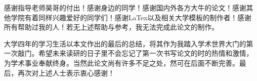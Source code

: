 \begin{acknowledgement}
    感谢指导老师昊哥的付出！感谢身边的同学！感谢国内外各方大牛的论文！感谢其他学院有着同样兴趣爱好的同学们！感谢LaTex以及相关大学模板的制作者！感谢所有帮助过我的人！若无上述帮助与参考，我无法完成此论文的制作。
    
    大学四年的学习生活以本文作出的最后的总结，将其作为我踏入学术世界大门的第一次敲门。希望未来读研的日子里不会忘记了第一次书写论文的时的热情和激情，为学术事业奉献终身。当然此论文尚有许多不足之处，然可在后面不断完善。最后，再次对上述人士表示衷心感谢！
\end{acknowledgement}